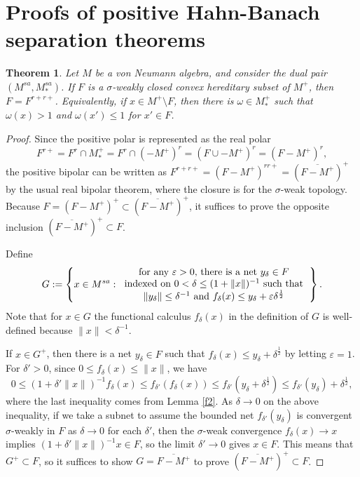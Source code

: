 \documentclass[noamsfonts,a4paper,10pt]{amsart}
\theoremstyle{plain}
\newtheorem{thm}{Theorem}[section]
\theoremstyle{definition}
\theoremstyle{remark}
\begin{document}
\section{Proofs of positive Hahn-Banach separation theorems}



\begin{thm}\label{1}
Let $M$ be a von Neumann algebra, and consider the dual pair $(M^{sa},M_*^{sa})$.
If $F$ is a $\sigma$-weakly closed convex hereditary subset of $M^+$, then $F=F^{r+r+}$.
Equivalently, if $x\in M^+\setminus F$, then there is $\omega\in M_*^+$ such that $\omega(x)>1$ and $\omega(x')\le1$ for $x'\in F$.
\end{thm}
\begin{proof}
Since the positive polar is represented as the real polar
\[F^{r+}=F^r\cap M_*^+=F^r\cap(-M^+)^r=(F\cup-M^+)^r=(F-M^+)^r,\]
the positive bipolar can be written as $F^{r+r+}=(F-M^+)^{rr+}=(\overline{F-M^+})^+$ by the usual real bipolar theorem, where the closure is for the $\sigma$-weak topology.
Because $F=(F-M^+)^+\subset(\overline{F-M^+})^+$, it suffices to prove the opposite inclusion $(\overline{F-M^+})^+\subset F$.

Define
\[G:=\left\{x\in M^{sa}:\begin{tabular}{c}
for any $\varepsilon>0$, there is a net $y_\delta\in F$\\
indexed on $0<\delta\le(1+\|x\|)^{-1}$ such that\\
$\|y_\delta\|\le\delta^{-1}$ and $f_\delta(x)\le y_\delta+\varepsilon\delta^{\frac12}$
\end{tabular}\right\}.\]
Note that for $x\in G$ the functional calculus $f_\delta(x)$ in the definition of $G$ is well-defined because $\|x\|<\delta^{-1}$.

If $x\in G^+$, then there is a net $y_\delta\in F$ such that $f_\delta(x)\le y_\delta+\delta^{\frac12}$ by letting $\varepsilon=1$.
For $\delta'>0$, since $0\le f_\delta(x)\le\|x\|$, we have
\[0\le(1+\delta'\|x\|)^{-1}f_\delta(x)\le f_{\delta'}(f_\delta(x))\le f_{\delta'}(y_\delta+\delta^{\frac12})\le f_{\delta'}(y_\delta)+\delta^{\frac12},\]
where the last inequality comes from Lemma \ref{f2}.
As $\delta\to0$ on the above inequality, if we take a subnet to assume the bounded net $f_{\delta'}(y_\delta)$ is convergent $\sigma$-weakly in $F$ as $\delta\to0$ for each $\delta'$, then the $\sigma$-weak convergence $f_\delta(x)\to x$ implies $(1+\delta'\|x\|)^{-1}x\in F$, so the limit $\delta'\to0$ gives $x\in F$.
This means that $G^+\subset F$, so it suffices to show $G=\overline{F-M^+}$ to prove $(\overline{F-M^+})^+\subset F$.


\end{proof}
\end{document}
